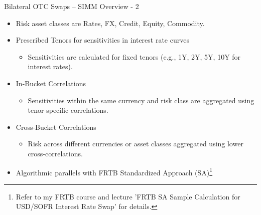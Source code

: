 \documentclass[handout, aspectratio=169]{beamer}
\begin{document}
\begin{frame}{Bilateral OTC Swaps – SIMM Overview - 2}
  \begin{itemize}
    \item Risk asset classes are Rates, FX, Credit, Equity, Commodity.
    \item Prescribed Tenors for sensitivities in interest rate curves
    \begin{itemize}
      \item Sensitivities are calculated for fixed tenors (e.g., 1Y, 2Y, 5Y, 10Y for interest rates).
    \end{itemize}
    \item In-Bucket Correlations
    \begin{itemize}
      \item Sensitivities within the same currency and risk class are aggregated using tenor-specific correlations.
    \end{itemize}
    \item Cross-Bucket Correlations
    \begin{itemize}
      \item Risk across different currencies or asset classes aggregated using lower cross-correlations.
    \end{itemize}
    \item Algorithmic parallels with FRTB Standardized Approach (SA)\footnote{Refer to my FRTB course and lecture 'FRTB SA Sample Calculation for USD/SOFR Interest Rate Swap' for details.}
  \end{itemize}
\end{frame}
\end{document}
